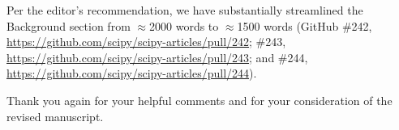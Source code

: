 \documentclass[10pt,stdletter,dateno]{newlfm}
\begin{document}
\begin{newlfm}
Per the editor's recommendation, we have substantially streamlined the Background section from $\approx$2000 words to $\approx$1500 words (GitHub \#242, \url{https://github.com/scipy/scipy-articles/pull/242}; \#243, \url{https://github.com/scipy/scipy-articles/pull/243}; and \#244, \url{https://github.com/scipy/scipy-articles/pull/244}).

Thank you again for your helpful comments and for your consideration of the revised manuscript.

\end{newlfm}
\end{document}

